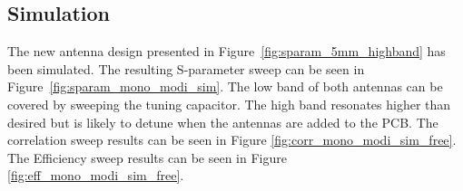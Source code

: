 \FloatBarrier
\subsection{Simulation}
\label{sec:highbandsimulations}


The new antenna design presented in Figure~\ref{fig:sparam_5mm_highband} has been simulated. The resulting S-parameter sweep can be seen in Figure~\ref{fig:sparam_mono_modi_sim}. The low band of both antennas can be covered by sweeping the tuning capacitor. The high band resonates higher than desired but is likely to detune when the antennas are added to the PCB.
The correlation sweep results can be seen in Figure \ref{fig:corr_mono_modi_sim_free}. The Efficiency sweep results can be seen in Figure \ref{fig:eff_mono_modi_sim_free}.

